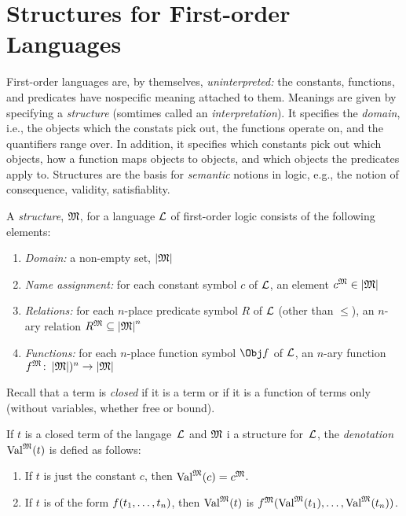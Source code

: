 \documentclass[open-logic-section]{subfiles}
\begin{document}
\section{Structures for First-order Languages}

\begin{wordy}
First-order languages are, by themselves, \emph{uninterpreted:} the
constants, functions, and predicates have nospecific meaning attached
to them.  Meanings are given by specifying a \emph{structure}
(somtimes called an \emph{interpretation}).  It specifies the
\emph{domain}, i.e., the objects which the constats pick out, the
functions operate on, and the quantifiers range over. In addition, it
specifies which constants pick out which objects, how a function maps
objects to objects, and which objects the predicates apply to.
Structures are the basis for \emph{semantic} notions in logic, e.g.,
the notion of consequence, validity, satisfiablity.
\end{wordy}

\begin{defn}[Structure]
A \emph{structure}, $\mathfrak{M}$, for a language $\mathcal{L}$ of
first-order logic consists of the following elements:
\begin{enumerate}
\item \emph{Domain:} a non-empty set, $\left| \mathfrak M \right|$ 
\item \emph{Name assignment:} for each constant symbol $c$ of
  $\mathcal{L}$, an element $c^{\mathfrak M} \in \left| \mathfrak M \right|$
\item \emph{Relations:} for each $n$-place predicate symbol $R$ of
  $\mathcal{L}$ (other than $\leq$), an $n$-ary relation $R^{\mathfrak M}
  \subseteq \left| \mathfrak M \right|^n$
\item \emph{Functions:} for each $n$-place function symbol $\Obj f$ of
  $\mathcal{L}$, an $n$-ary function $f^{\mathfrak M} \colon
  \left| \mathfrak M \right|)^n \to \left| \mathfrak M \right|$
\end{enumerate}
\end{defn}

\begin{wordy}
Recall that a term is \emph{closed} if it is a term or if it is a
function of terms only (without variables, whether free or bound).
\end{wordy}

\begin{defn}
If $t$ is a closed term of the langage~$\mathcal L$ and $\mathfrak M$ i a structure for~$\mathcal L$, the \emph{denotation}~$\Value{t}{M}$ is defied as follows:
\begin{enumerate}
\item If $t$ is just the constant $c$, then $\Value{c}{M} = \Assign{c}{M}$.
\item If $t$ is of the form ${ f(t_1, \ldots, t_n) }$, then
  $\Value{t}{M}$ is $\Assign{f}{M}(\Value{t_1}{M}, \ldots,
  \Value{t_n}{M})$.
\end{enumerate}
\end{defn}
\end{document}
